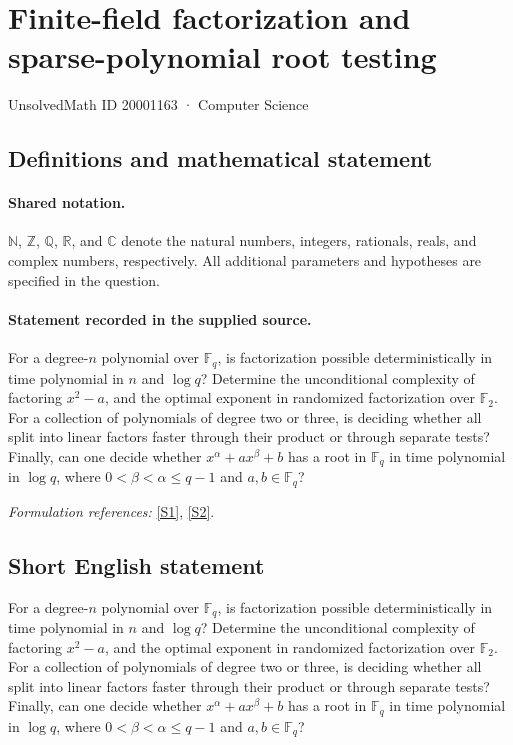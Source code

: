 \documentclass[11pt]{article}
\newcommand{\sref}[2]{\hyperlink{source:#1:#2}{[S#2]}}
\begin{document}
\setcounter{section}{20001162}
\section{Finite-field factorization and sparse-polynomial root testing}\label{20001163}
{\small UnsolvedMath ID 20001163 · Computer Science}
\subsection{Definitions and mathematical statement}

\paragraph{Shared notation.}$\mathbb N$, $\mathbb Z$, $\mathbb Q$, $\mathbb R$, and $\mathbb C$ denote the natural numbers, integers, rationals, reals, and complex numbers, respectively. All additional parameters and hypotheses are specified in the question.


\paragraph{Statement recorded in the supplied source.}
For a degree-$n$ polynomial over $\mathbb F_q$, is factorization possible deterministically in time polynomial in $n$ and $\log q$? Determine the unconditional complexity of factoring $x^2-a$, and the optimal exponent in randomized factorization over $\mathbb F_2$. For a collection of polynomials of degree two or three, is deciding whether all split into linear factors faster through their product or through separate tests? Finally, can one decide whether $x^\alpha+ax^\beta+b$ has a root in $\mathbb F_q$ in time polynomial in $\log q$, where $0<\beta<\alpha\leq q-1$ and $a,b\in\mathbb F_q$?
\par\smallskip\textit{Formulation references:} \sref{20001163}{1}, \sref{20001163}{2}.
\subsection{Short English statement}
For a degree-$n$ polynomial over $\mathbb F_q$, is factorization possible deterministically in time polynomial in $n$ and $\log q$? Determine the unconditional complexity of factoring $x^2-a$, and the optimal exponent in randomized factorization over $\mathbb F_2$. For a collection of polynomials of degree two or three, is deciding whether all split into linear factors faster through their product or through separate tests? Finally, can one decide whether $x^\alpha+ax^\beta+b$ has a root in $\mathbb F_q$ in time polynomial in $\log q$, where $0<\beta<\alpha\leq q-1$ and $a,b\in\mathbb F_q$?
\end{document}

